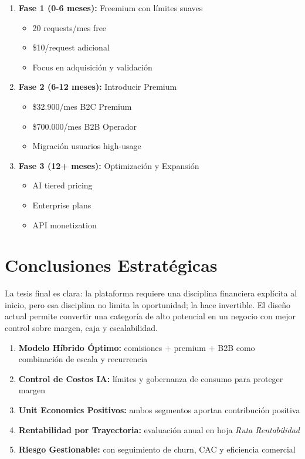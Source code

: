 \documentclass[12pt]{article}
\begin{document}
\begin{enumerate}
    \item \textbf{Fase 1 (0-6 meses):} Freemium con límites suaves
    \begin{itemize}
        \item 20 requests/mes free
        \item \$10/request adicional
        \item Focus en adquisición y validación
    \end{itemize}
    
    \item \textbf{Fase 2 (6-12 meses):} Introducir Premium
    \begin{itemize}
        \item \$32.900/mes B2C Premium
        \item \$700.000/mes B2B Operador
        \item Migración usuarios high-usage
    \end{itemize}
    
    \item \textbf{Fase 3 (12+ meses):} Optimización y Expansión
    \begin{itemize}
        \item AI tiered pricing
        \item Enterprise plans
        \item API monetization
    \end{itemize}
\end{enumerate}

\section{Conclusiones Estratégicas}

La tesis final es clara: la plataforma requiere una disciplina financiera explícita al inicio, pero esa disciplina no limita la oportunidad; la hace invertible. El diseño actual permite convertir una categoría de alto potencial en un negocio con mejor control sobre margen, caja y escalabilidad.

\begin{enumerate}
    \item \textbf{Modelo Híbrido Óptimo:} comisiones + premium + B2B como combinación de escala y recurrencia
    \item \textbf{Control de Costos IA:} límites y gobernanza de consumo para proteger margen
    \item \textbf{Unit Economics Positivos:} ambos segmentos aportan contribución positiva
    \item \textbf{Rentabilidad por Trayectoria:} evaluación anual en hoja \textit{Ruta Rentabilidad}
    \item \textbf{Riesgo Gestionable:} con seguimiento de churn, CAC y eficiencia comercial
\end{enumerate}
\end{document}
